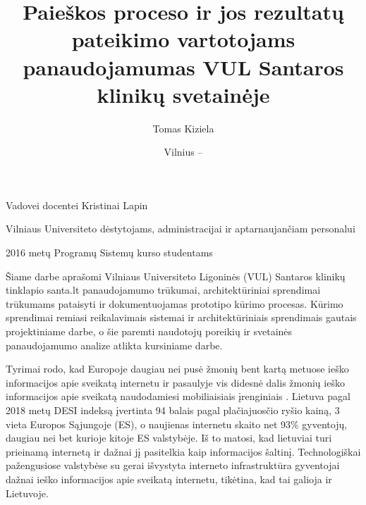 \documentclass{VUMIFPSbakalaurinis}
\title{Paieškos proceso ir jos rezultatų pateikimo vartotojams panaudojamumas VUL Santaros klinikų svetainėje}
\author{Tomas Kiziela}
\date{Vilnius – \the\year}
\begin{document}
\maketitle
\setcounter{page}{2}

\vspace{7cm}
\begin{center}
    Vadovei docentei Kristinai Lapin
    
    Vilniaus Universiteto dėstytojams, administracijai ir aptarnaujančiam personalui
    
    2016 metų Programų Sistemų kurso studentams
    
\end{center}



\tableofcontents

Šiame darbe aprašomi Vilniaus Universiteto Ligoninės (VUL) Santaros klinikų tinklapio santa.lt panaudojamumo trūkumai, architektūriniai sprendimai trūkumams pataisyti ir dokumentuojamas prototipo kūrimo procesas. Kūrimo sprendimai remiasi reikalavimais sistemai ir architektūriniais sprendimais gautais projektiniame darbe, o šie paremti naudotojų poreikių ir svetainės panaudojamumo analize atlikta kursiniame darbe.

Tyrimai rodo, kad Europoje daugiau nei pusė žmonių bent kartą metuose ieško informacijos apie sveikatą internetu \cite{EuCitizDigHealthEn} ir pasaulyje vis didesnė dalis žmonių ieško informacijos apie sveikatą naudodamiesi mobiliaisiais įrenginiais \cite{EmergingmHealthEn}. Lietuva pagal 2018 metų DESI indeksą įvertinta 94 balais pagal plačiajuosčio ryšio kainą, 3 vieta Europos Sąjungoje (ES), o naujienas internetu skaito net 93\% gyventojų, daugiau nei bet kurioje kitoje ES valstybėje\cite{InternetasLt}. Iš to matosi, kad lietuviai turi prieinamą internetą ir dažnai jį pasitelkia kaip informacijos šaltinį. Technologiškai pažengusiose valstybėse su gerai išvystyta interneto infrastruktūra gyventojai dažnai ieško informacijos apie sveikatą internetu\cite{InternetUseByPublicSAEn}\cite{InternetUseByPublicHKEn}, tikėtina, kad tai galioja ir Lietuvoje.
\end{document}
